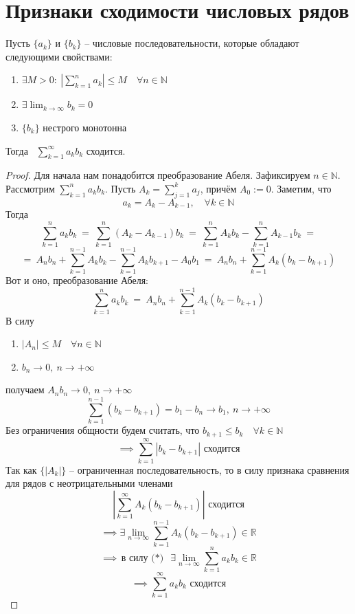 \documentclass[11pt]{article}
\begin{document}
\section{Признаки сходимости числовых рядов}

\begin{theorem}
  Пусть $\{a_k\}$ и $\{b_k\}$ -- числовые последовательности, которые 
  обладают следующими свойствами:
  \begin{enumerate}
    \item $\exists M > 0: \ \left\lvert \displaystyle \sum_{k = 1}^{n} 
    a_k \right\rvert \leq M \quad \forall n \in \mathbb{N}$
    \item $\exists \displaystyle \lim_{k \to \infty} b_k = 0$
    \item $\{b_k\}$ нестрого монотонна
  \end{enumerate}
  Тогда \ $\displaystyle \sum_{k = 1}^{\infty} a_kb_k$ сходится.
\end{theorem}

\begin{proof}
  Для начала нам понадобится преобразование Абеля. Зафиксируем $n \in \mathbb{N}$. 
  Рассмотрим $\displaystyle \sum_{k = 1}^{n} a_kb_k$. Пусть $A_k = \displaystyle 
  \sum_{j = 1}^{k} a_j$, причём $A_0 := 0$. Заметим, что
  \[a_k = A_k - A_{k - 1}, \quad \forall k \in \mathbb{N}\]
  Тогда
  \[\sum_{k = 1}^{n} a_kb_k \ = \ \sum_{k = 1}^{n} (A_k - A_{k - 1})b_k \ = \ 
  \sum_{k = 1}^{n} A_kb_k - \sum_{k = 1}^{n} A_{k - 1}b_k \ =\]
  \[= \ A_nb_n + \sum_{k = 1}^{n - 1} A_kb_k - \sum_{k = 1}^{n - 1} 
  A_kb_{k + 1} - A_0b_1 \ = \ A_nb_n + \sum_{k = 1}^{n - 1} A_k
  (b_k - b_{k + 1})\]
  Вот и оно, преобразование Абеля:
  \[\sum_{k = 1}^{n} a_kb_k \ = \ A_nb_n + \sum_{k = 1}^{n - 1} A_k
  (b_k - b_{k + 1}) \tag{$\ast$}\]
  В силу 
  \begin{enumerate}
    \item $\left\lvert A_n \right\rvert \leq M \quad \forall n \in \mathbb{N}$
    \item $b_n \to 0, \ n \to + \infty$
  \end{enumerate}
  получаем $A_nb_n \to 0, \ n \to + \infty$
  \[\sum_{k = 1}^{n - 1} (b_k - b_{k + 1}) = b_1 - b_n \to b_1, \ n \to + 
  \infty\] 
  Без ограничения общности будем считать, что $b_{k + 1} \leq b_k \quad 
  \forall k \in \mathbb{N}$
  \[\implies \sum_{k = 1}^{\infty} \left\lvert b_k - b_{k + 1} \right\rvert 
  \text{ сходится}\] 
  Так как $\{\left\lvert A_k \right\rvert\}$ -- ограниченная последовательность, 
  то в силу признака сравнения для рядов с неотрицательными членами
  \[\left\lvert \sum_{k = 1}^{\infty} A_k(b_k - b_{k + 1}) \right\rvert 
  \text{ сходится}\]
  \[\implies \exists \lim_{n \to \infty} \sum_{k = 1}^{n - 1} A_k(b_k - 
  b_{k + 1}) \in \mathbb{R}\]
  \[\implies \text{в силу ($\ast$) } \ \exists \lim_{n \to \infty} 
  \sum_{k = 1}^{n} a_kb_k \in \mathbb{R}\]
  \[\implies \sum_{k = 1}^{\infty} a_kb_k \text{ сходится}\]
\end{proof}
\end{document}
